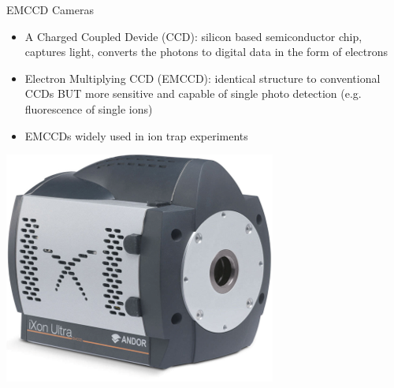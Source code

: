 \documentclass{beamer}
\begin{document}
\begin{frame}{EMCCD Cameras}

\begin{itemize}
\item A Charged Coupled Devide (CCD): silicon based semiconductor chip, captures light, converts the photons to digital data in the form of electrons
\bigskip
\item Electron Multiplying CCD (EMCCD):  identical structure to conventional CCDs BUT more sensitive and capable of single photo detection (e.g. fluorescence of single ions)
\bigskip
\item EMCCDs widely used in ion trap experiments
\end{itemize}

\centering
\includegraphics[scale=0.38]{Figures/iXon-Ultra-897.png}

\end{frame}

\end{document}
